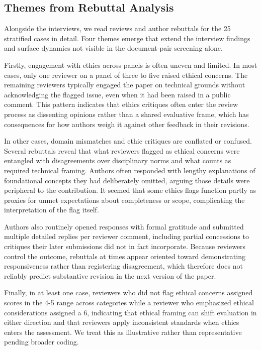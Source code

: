 \documentclass[sigconf,nonacm]{acmart} %
\begin{document}
\subsection{Themes from Rebuttal Analysis}
Alongside the interviews, we read reviews and author rebuttals for the 25 stratified cases in detail. Four themes emerge that extend the interview findings and surface dynamics not visible in the document-pair screening alone.

Firstly, engagement with ethics across panels is often uneven and limited. In most cases, only one reviewer on a panel of three to five raised ethical concerns. The remaining reviewers typically engaged the paper on technical grounds without acknowledging the flagged issue, even when it had been raised in a public comment. This pattern indicates that ethics critiques often enter the review process as dissenting opinions rather than a shared evaluative frame, which has consequences for how authors weigh it against other feedback in their revisions.

In other cases, domain mismatches and ethic critiques are conflated or confused. Several rebuttals reveal that what reviewers flagged as ethical concerns were entangled with disagreements over disciplinary norms and what counts as required technical framing. Authors often responded with lengthy explanations of foundational concepts they had deliberately omitted, arguing those details were peripheral to the contribution. It seemed that some ethics flags function partly as proxies for unmet expectations about completeness or scope, complicating the interpretation of the flag itself.

Authors also routinely opened responses with formal gratitude and submitted multiple detailed replies per reviewer comment, including partial concessions to critiques their later submissions did not in fact incorporate. Because reviewers control the outcome, rebuttals at times appear oriented toward demonstrating responsiveness rather than registering disagreement, which therefore does not reliably predict substantive revision in the next version of the paper.

Finally, in at least one case, reviewers who did not flag ethical concerns assigned scores in the 4-5 range across categories while a reviewer who emphasized ethical considerations assigned a 6, indicating that ethical framing can shift evaluation in either direction and that reviewers apply inconsistent standards when ethics enters the assessment. We treat this as illustrative rather than representative pending broader coding.
\end{document}

